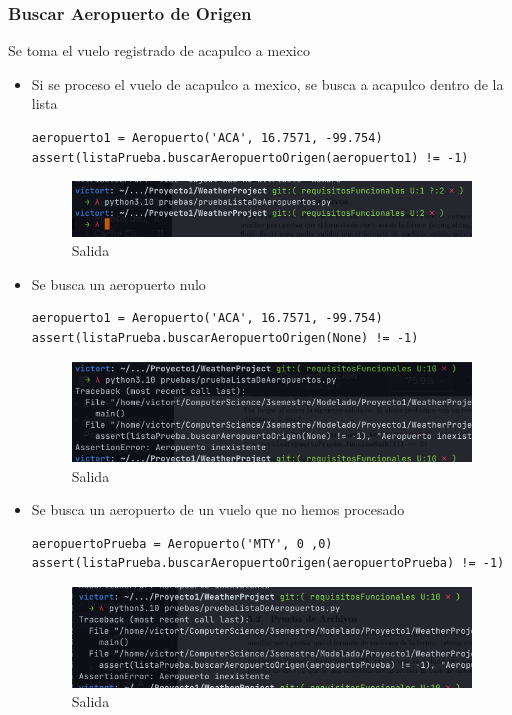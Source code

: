 \documentclass[12pt]{article}
\begin{document}
\subsubsection{Buscar Aeropuerto de Origen}
Se toma el vuelo registrado de acapulco a mexico
\begin{itemize}
\item Si se proceso el vuelo de acapulco a mexico, se busca a acapulco dentro de la lista
\begin{verbatim}
aeropuerto1 = Aeropuerto('ACA', 16.7571, -99.754)
assert(listaPrueba.buscarAeropuertoOrigen(aeropuerto1) != -1)    
\end{verbatim}
\begin{figure}[h!]
    \centering
    \includegraphics[scale=0.7]{pruebasPy/listaAeropuertos/bien.png}
    \caption{Salida}
\end{figure}

\item Se busca un aeropuerto nulo
\begin{verbatim}
aeropuerto1 = Aeropuerto('ACA', 16.7571, -99.754)
assert(listaPrueba.buscarAeropuertoOrigen(None) != -1)    
\end{verbatim}
  \newpage
\begin{figure}[h!]
    \centering
    \includegraphics[scale=0.7]{pruebasPy/listaAeropuertos/buscaNone.png}
    \caption{Salida}
  \end{figure}

\item Se busca un aeropuerto de un vuelo que no hemos procesado
\begin{verbatim}
aeropuertoPrueba = Aeropuerto('MTY', 0 ,0)
assert(listaPrueba.buscarAeropuertoOrigen(aeropuertoPrueba) != -1)    
\end{verbatim}
\begin{figure}[h!]
    \centering
    \includegraphics[scale=0.7]{pruebasPy/listaAeropuertos/buscaInex.png}
    \caption{Salida}
  \end{figure}
\end{itemize}
\end{document}
